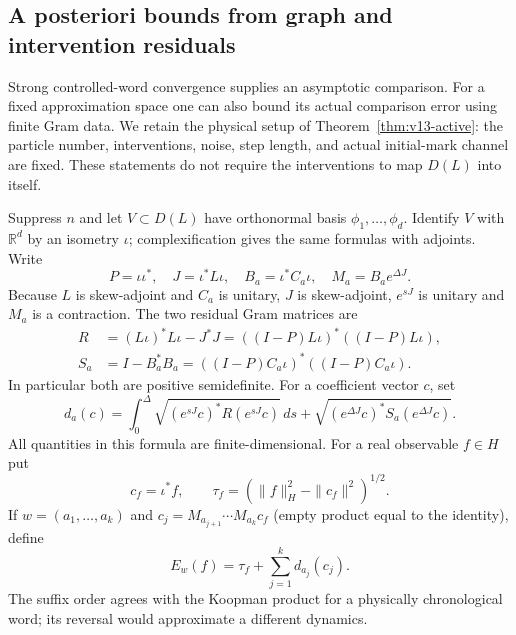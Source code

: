 \subsection{A posteriori bounds from graph and intervention residuals}
\label{sec:v14-residual}
Strong controlled-word convergence supplies an asymptotic comparison.
For a fixed approximation space one can also bound its actual comparison
error using finite Gram data. We retain the physical setup of
Theorem~\ref{thm:v13-active}: the particle number, interventions, noise,
step length, and actual initial-mark channel are fixed. These statements
do not require the interventions to map $D(L)$ into itself.

Suppress $n$ and let $V\subset D(L)$ have orthonormal basis
$\phi_1,\ldots,\phi_d$. Identify $V$ with $\mathbb R^d$ by an isometry
$\iota$; complexification gives the same formulas with adjoints. Write
\[
 P=\iota\iota^*,\quad J=\iota^*L\iota,\quad
 B_a=\iota^*C_a\iota,\quad M_a=B_a e^{\Delta J}.
\]
Because $L$ is skew-adjoint and $C_a$ is unitary, $J$ is skew-adjoint,
$e^{sJ}$ is unitary and $M_a$ is a contraction. The two residual Gram
matrices are
\begin{align}
 R&=(L\iota)^*L\iota-J^*J
       =((I-P)L\iota)^*((I-P)L\iota),\label{eq:v14-R}\\
 S_a&=I-B_a^*B_a
       =((I-P)C_a\iota)^*((I-P)C_a\iota).\label{eq:v14-S}
\end{align}
In particular both are positive semidefinite. For a coefficient vector
$c$, set
\begin{equation}\label{eq:v14-defect}
 d_a(c)=\int_0^\Delta
      \sqrt{(e^{sJ}c)^*R(e^{sJ}c)}\,ds
     +\sqrt{(e^{\Delta J}c)^*S_a(e^{\Delta J}c)}.
\end{equation}
All quantities in this formula are finite-dimensional. For a real
observable $f\in H$ put
\[
 c_f=\iota^*f,\qquad
 \tau_f=(\|f\|_H^2-\|c_f\|^2)^{1/2}.
\]
If $w=(a_1,\ldots,a_k)$ and
$c_j=M_{a_{j+1}}\cdots M_{a_k}c_f$ (empty product equal to the identity),
define
\begin{equation}\label{eq:v14-word-residual}
 E_w(f)=\tau_f+\sum_{j=1}^k d_{a_j}(c_j).
\end{equation}
The suffix order agrees with the Koopman product for a physically
chronological word; its reversal would approximate a different dynamics.

